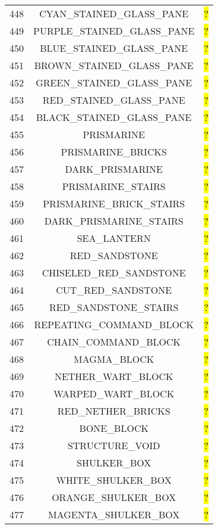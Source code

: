 \documentclass[11pt]{article}
\newcommand\myworries[1]{\sethlcolor{red}\hl{#1}}
\begin{document}
\begin{longtable}{ |c|c|c| }
	448 & CYAN\_STAINED\_GLASS\_PANE & \myworries{?} \\
	449 & PURPLE\_STAINED\_GLASS\_PANE & \myworries{?} \\
	450 & BLUE\_STAINED\_GLASS\_PANE & \myworries{?} \\
	451 & BROWN\_STAINED\_GLASS\_PANE & \myworries{?} \\
	452 & GREEN\_STAINED\_GLASS\_PANE & \myworries{?} \\
	453 & RED\_STAINED\_GLASS\_PANE & \myworries{?} \\
	454 & BLACK\_STAINED\_GLASS\_PANE & \myworries{?} \\
	455 & PRISMARINE & \myworries{?} \\
	456 & PRISMARINE\_BRICKS & \myworries{?} \\
	457 & DARK\_PRISMARINE & \myworries{?} \\
	458 & PRISMARINE\_STAIRS & \myworries{?} \\
	459 & PRISMARINE\_BRICK\_STAIRS & \myworries{?} \\
	460 & DARK\_PRISMARINE\_STAIRS & \myworries{?} \\
	461 & SEA\_LANTERN & \myworries{?} \\
	462 & RED\_SANDSTONE & \myworries{?} \\
	463 & CHISELED\_RED\_SANDSTONE & \myworries{?} \\
	464 & CUT\_RED\_SANDSTONE & \myworries{?} \\
	465 & RED\_SANDSTONE\_STAIRS & \myworries{?} \\
	466 & REPEATING\_COMMAND\_BLOCK & \myworries{?} \\
	467 & CHAIN\_COMMAND\_BLOCK & \myworries{?} \\
	468 & MAGMA\_BLOCK & \myworries{?} \\
	469 & NETHER\_WART\_BLOCK & \myworries{?} \\
	470 & WARPED\_WART\_BLOCK & \myworries{?} \\
	471 & RED\_NETHER\_BRICKS & \myworries{?} \\
	472 & BONE\_BLOCK & \myworries{?} \\
	473 & STRUCTURE\_VOID & \myworries{?} \\
	474 & SHULKER\_BOX & \myworries{?} \\
	475 & WHITE\_SHULKER\_BOX & \myworries{?} \\
	476 & ORANGE\_SHULKER\_BOX & \myworries{?} \\
	477 & MAGENTA\_SHULKER\_BOX & \myworries{?} \\

\end{longtable}
\end{document}
